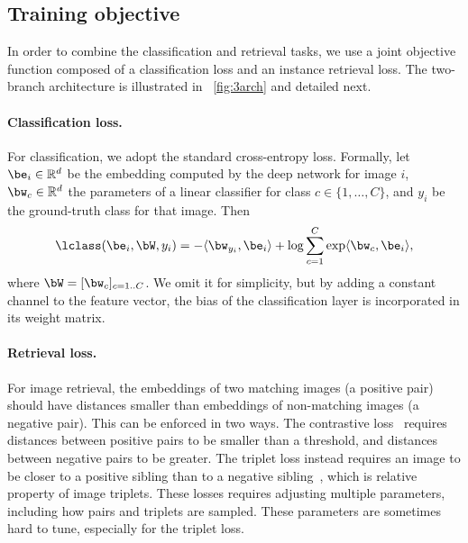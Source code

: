 %
%

%

\subsection{Training objective\label{sec:losses}}

In order to combine the classification and retrieval tasks, we use a joint objective function composed of a classification loss and an instance retrieval loss. 
The two-branch architecture is illustrated in ~\cref{fig:3arch} and detailed next.

\paragraph{Classification loss.}

For classification, we adopt the standard cross-entropy loss.
Formally, let $\be_i\in\mathbb{R}^d$ be the embedding computed by the deep network for image $i$, $\bw_c \in \mathbb{R}^{d}$ the parameters of a linear classifier for class $c \in \{1,\dots,C\}$, and $y_i$ be the ground-truth class for that image.
Then
\begin{equation}\label{eq:crossent}
\lclass(\be_i,\bW,y_i)
=
- \langle \bw_{y_i}, \be_i \rangle
+ \log \sum_{c=1}^C
\exp \langle\bw_c, \be_i \rangle,
\end{equation}
where $\bW=[\bw_c]_{c=1..C}$.
We omit it for simplicity, but by adding a constant channel to the feature vector, the  bias of the classification layer is incorporated in its weight matrix. 


\paragraph{Retrieval loss.}

For image retrieval, the embeddings of two matching images (a positive pair) should have distances smaller than embeddings of non-matching images (a negative pair). 
%
This can be enforced in two ways. 
The contrastive loss~\cite{hadsell2006dimensionality} requires distances between positive pairs to be smaller than a threshold, and distances between negative pairs to be greater.
The triplet loss instead requires an image to be closer to a positive sibling than to a negative sibling~\cite{schroff2015facenet}, which is relative property of image triplets.
%
These losses requires adjusting multiple parameters, including how pairs and triplets are sampled. These parameters are sometimes hard to tune, especially for the triplet loss.

